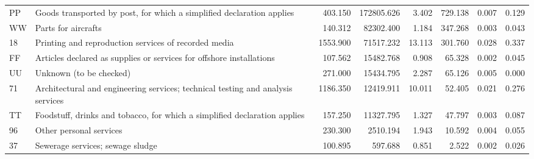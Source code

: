 \begin{tabular}{llrrrrrr}
          PP &                                        Goods transported by post, for which a simplified declaration applies &         403.150 &       172805.626 &       3.402 &              729.138 &        0.007 &                 0.129 \\
          WW &                                                                                          Parts for aircrafts &         140.312 &        82302.400 &       1.184 &              347.268 &        0.003 &                 0.043 \\
          18 &                                                         Printing and reproduction services of recorded media &        1553.900 &        71517.232 &      13.113 &              301.760 &        0.028 &                 0.337 \\
          FF &                                         Articles declared as supplies or services for offshore installations &         107.562 &        15482.768 &       0.908 &               65.328 &        0.002 &                 0.045 \\
          UU &                                                                                      Unknown (to be checked) &         271.000 &        15434.795 &       2.287 &               65.126 &        0.005 &                 0.000 \\
          71 &                              Architectural and engineering services; technical testing and analysis services &        1186.350 &        12419.911 &      10.011 &               52.405 &        0.021 &                 0.276 \\
          TT &                                    Foodstuff, drinks and tobacco, for which a simplified declaration applies &         157.250 &        11327.795 &       1.327 &               47.797 &        0.003 &                 0.087 \\
          96 &                                                                                      Other personal services &         230.300 &         2510.194 &       1.943 &               10.592 &        0.004 &                 0.055 \\
          37 &                                                                             Sewerage services; sewage sludge &         100.895 &          597.688 &       0.851 &                2.522 &        0.002 &                 0.026 \\
\bottomrule
\end{tabular}
